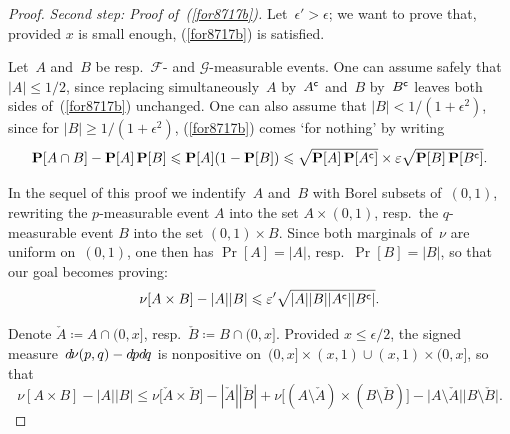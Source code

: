 \begin{proof}
\noindent\textit{Second step: Proof of~(\ref{for8717b}).}\quad
Let~$\epsilon'>\epsilon$; we want to prove that, provided $x$ is small enough,
(\ref{for8717b}) is satisfied.

Let~$A$ and~$B$ be resp.\ $\mathcal{F}$- and $\mathcal{G}$-measurable events.
One can assume safely that $|A| \leq 1/2$,
since replacing simultaneously~$A$ by~$A^{\mathsf{c}}$ and~$B$ by~$B^{\mathsf{c}}$ leaves
both sides of~(\ref{for8717b}) unchanged.
%
One can also assume that $|B| < 1/(1+\epsilon^2)$,
since for $|B|\geq1/(1+\epsilon^2)$, (\ref{for8717b}) comes `for nothing'
by writing
\[ \mathop{\smash{\mathbf{P}}}\nolimits[A\cap B] - \mathop{\smash{\mathbf{P}}}\nolimits[A]\mathop{\smash{\mathbf{P}}}\nolimits[B] \leqslant \mathop{\smash{\mathbf{P}}}\nolimits[A](1-\mathop{\smash{\mathbf{P}}}\nolimits[B]) \leqslant
\sqrt{\mathop{\smash{\mathbf{P}}}\nolimits[A]\mathop{\smash{\mathbf{P}}}\nolimits[A^{\mathsf{c}}]} \times \varepsilon \sqrt{\mathop{\smash{\mathbf{P}}}\nolimits[B]\mathop{\smash{\mathbf{P}}}\nolimits[B^{\mathsf{c}}]}
.\]

\begin{NOTA}
In the sequel of this proof we indentify~$A$ and~$B$ with Borel subsets of~$(0,1)$,
rewriting the $p$-measurable event $A$ into the set $A\times(0,1)$, resp.\
the $q$-measurable event $B$ into the set $(0,1)\times B$.
Since both marginals of~$\nu$ are uniform on~$(0,1)$,
one then has $\Pr[A]=|A|$, resp.\ $\Pr[B]=|B|$, so that our goal becomes proving:
\[ \nu[A\times B] - |A||B| \leqslant \varepsilon' \sqrt{|A||B||A^{\mathsf{c}}||B^{\mathsf{c}}|} .\]
\end{NOTA}

Denote $\check{A} \coloneqq A\cap(0,x]$, resp.\ $\check{B} \coloneqq B\cap(0,x]$.
Provided $x\leq\epsilon/2$, the signed measure~$\dx\nu(p,q) - \dx{p}\dx{q}$ is nonpositive
on~$(0,x]\times(x,1) \cup (x,1)\times(0,x]$,
so that
\[\label{for1899}
\nu[A\times B] - |A||B| \leq
\nu\big[\check{A}\times\check{B}\big] - |\check{A}| |\check{B}|
+ \nu\big[(A\setminus\check{A})\times(B\setminus\check{B})\big]
- \big|A\setminus\check{A}\big| \big|B\setminus\check{B}\big| .\]


\end{proof}
